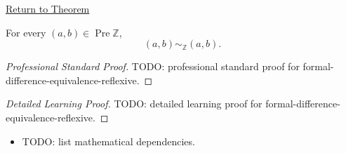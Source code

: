 \newpage
{}
\label{prf:formal-difference-equivalence-reflexive}

\begin{remark*}[Return]
\hyperref[lem:formal-difference-equivalence-reflexive]{Return to Theorem}
\end{remark*}

\begin{lemma*}
For every $(a,b)\in\operatorname{Pre}\mathbb{Z}$,
\[
(a,b)\sim_{\mathbb{Z}}(a,b).
\]
\end{lemma*}

\begin{proof}[Professional Standard Proof]
\LRAProofBodyStart
TODO: professional standard proof for formal-difference-equivalence-reflexive.
\end{proof}

\begin{proof}[Detailed Learning Proof]
\LRAProofBodyStart
TODO: detailed learning proof for formal-difference-equivalence-reflexive.
\end{proof}

\begin{remark*}
\end{remark*}

\begin{dependencies}
\begin{itemize}
  \item TODO: list mathematical dependencies.
\end{itemize}
\end{dependencies}

\clearpage
